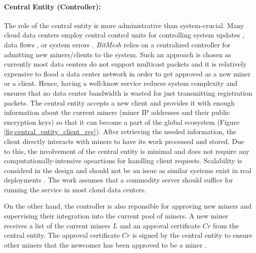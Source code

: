 \documentclass[11px]{article}
\newcommand{\projTitle}{BitMesh\xspace}
\begin{document}
\paragraph{Central Entity (Controller):} The role of the central entity is more administrative than system-crucial. Many cloud data centers employ central control units for controlling system updates \cite{microsoft-autopilot}, data flows \cite{google_jupiter}, or system errors \cite{microsoft_netpoirot}. \textit{\projTitle} relies on a centralized controller for admitting new miners/clients to the system. Such an approach is chosen as currently most data centers do not support multicast packets and it is relatively expensive to flood a data center network in order to get approved as a new miner or a client. Hence, having a well-know service reduces system complexity and ensures that no data center bandwidth is wasted for just transmitting registration packets. The central entity accepts a new client and provides it with enough information about the current miners (miner IP addresses and their public encryption keys) so that it can become a part of the global ecosystem (Figure \ref{fig:central_entity_client_reg}). After retrieving the needed information, the client directly interacts with miners to have its work processed and stored. Due to this, the involvement of the central entity is minimal and does not require any computationally-intensive opeartions for handling client requests. Scalability is considred in the design and should not be an issue as similar systems exist in real deployments \cite{hadoop_example}. The work assumes that a commodity server should suffice for running the service in most cloud data centers.
\par


\noindent \newline On the other hand, the controller is also reponsible for approving new miners and supervising their integration into the current pool of miners. A new miner receives a list of the current miners $L$ and an approval certificate $Cr$ from the central entity.
The approval certificate $Cr$ is signed by the central entity to ensure other miners that the newcomer has been approved to be a miner \cite{public-auth-certificate}.
\end{document}
